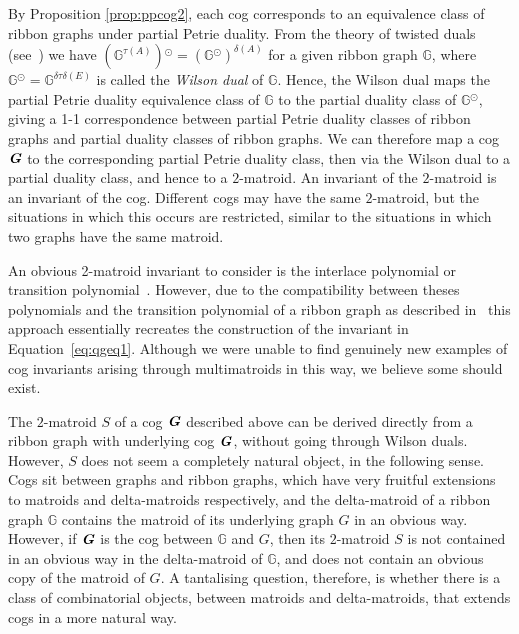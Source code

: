 \documentclass{amsart}
\newcommand{\bG}{\mathbb{G}}
\newcommand{\cog}[1]{\textbf{\textit #1}}
\def\wil{{}^\odot}
\theoremstyle{definition}
\theoremstyle{remark}
\numberwithin{equation}{section}
\begin{document}
\begin{enumerate}
By Proposition \ref{prop:ppcog2}, each cog corresponds to an equivalence class of ribbon graphs under partial Petrie duality.
From the theory of twisted duals (see~\cite{MR2869185}) we have
$(\bG^{\tau(A)})\wil = (\bG\wil)^{\delta(A)}$ for a given ribbon graph $\bG$, where $\bG\wil =  \bG^{\delta\tau\delta(E)}$ is called the \emph{Wilson dual} of $\bG$.  Hence, the Wilson dual maps the partial Petrie duality equivalence class of $\bG$ to the partial duality class of $\bG\wil$, giving a 1-1 correspondence between partial Petrie duality classes of ribbon graphs and partial duality classes of ribbon graphs.  We can therefore map a cog $\cog{G}$ to the corresponding partial Petrie duality class, then via the Wilson dual to a partial duality class, and hence to a $2$-matroid.  An invariant of the $2$-matroid is an invariant of the cog.  Different cogs may have the same $2$-matroid, but the situations in which this occurs are restricted, similar to the situations in which two graphs have the same matroid.

An obvious 2-matroid invariant to consider is the interlace polynomial or transition polynomial~\cite{MR3191496}. However, due to the compatibility between theses polynomials and the transition polynomial of a ribbon graph as described in~\cite{CMNR2} this approach essentially recreates the construction of the invariant in Equation~\eqref{eq:qgeq1}. 
Although we were unable to find genuinely new examples of cog invariants arising through multimatroids in this way, we believe some should exist.

The $2$-matroid $S$ of a cog $\cog{G}$ described above can be derived directly from a ribbon graph with underlying cog $\cog{G}$, without going through Wilson duals.
However, $S$ does not seem a completely natural object, in the following sense.
Cogs sit between graphs and ribbon graphs, which have very fruitful extensions to matroids and delta-matroids respectively, and the delta-matroid of a ribbon graph $\bG$ contains the matroid of its underlying graph $G$ in an obvious way.
However, if $\cog{G}$ is the cog between $\bG$ and $G$, then its $2$-matroid $S$ is not contained in an obvious way in the delta-matroid of $\bG$, and does not contain an obvious copy of the matroid of $G$.
A tantalising question, therefore, is whether there is a class of combinatorial objects, between matroids and delta-matroids, that extends cogs in a more natural way. 


\end{enumerate}
\end{document}
